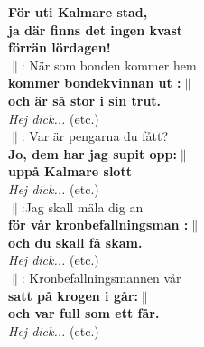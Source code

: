 \documentclass[a6paper,10pt]{article}
\begin{document}
\textbf{För uti Kalmare stad,\\ ja där finns det ingen kvast\\ förrän lördagen!}
\vspace{5pt} \\
$\|$: När som bonden kommer hem \\
\textbf{kommer bondekvinnan ut :$\|$ \\och är så stor i sin trut.}
\vspace{5pt} \\
\textit{Hej dick...} (etc.) 
\vspace{5pt} \\
$\|$: Var är pengarna du fått?\\
\textbf{Jo, dem har jag supit opp:$\|$ \\uppå Kalmare slott}
\vspace{5pt} \\
\textit{Hej dick...} (etc.)
\vspace{5pt} \\
$\|$:Jag skall mäla dig an\\
\textbf{för vår kronbefallningsman :$\|$ \\ och du skall få skam.}
\setlength{\oddsidemargin}{-0.37in}
\noindent
\vspace{5pt} \\
\textit{Hej dick...} (etc.)
\vspace{5pt} \\
$\|$: Kronbefallningsmannen vår \\
\textbf{satt på krogen i går:$\|$\\ och var full som ett får.}
\vspace{5pt} \\
\textit{Hej dick...} (etc.)
\end{document}
